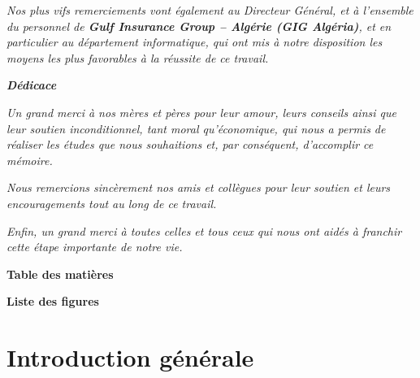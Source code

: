 \documentclass{article}
\begin{document}
\begin{center}
\vspace{1cm}

\fontsize{14pt}{16pt}\selectfont\textit{%
Nos plus vifs remerciements vont également au Directeur Général, et à l’ensemble du personnel de \textbf{Gulf Insurance Group – Algérie (GIG Algéria)}, et en particulier au département informatique, qui ont mis à notre disposition les moyens les plus favorables à la réussite de ce travail.%
}



\end{center}

\newpage
\cleardoublepage
\thispagestyle{empty}

\begin{center}
{\Huge \textbf{\textit{Dédicace}}}

\vspace{2cm}

\fontsize{14pt}{16pt}\selectfont\textit{Un grand merci à nos mères et pères pour leur amour, leurs conseils ainsi que leur soutien inconditionnel, tant moral qu’économique, qui nous a permis de réaliser les études que nous souhaitions et, par conséquent, d’accomplir ce mémoire.}

\vspace{1cm}

\fontsize{14pt}{16pt}\selectfont\textit{Nous remercions sincèrement nos amis et collègues pour leur soutien et leurs encouragements tout au long de ce travail.}

\vspace{1cm}

\fontsize{14pt}{16pt}\selectfont\textit{Enfin, un grand merci à toutes celles et tous ceux qui nous ont aidés à franchir cette étape importante de notre vie. }

\end{center}

\newpage
\begin{center}
{\Huge \textbf{Table des matières}}
\end{center}
\renewcommand{\contentsname}{}
\tableofcontents
\newpage
\begin{center}
{\Huge \textbf{Liste des figures}}
\end{center}
\renewcommand{\listfigurename}{}
\listoffigures
\newpage
{}
\setcounter{page}{1}

\section{Introduction générale}
\end{document}
